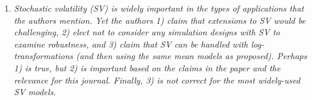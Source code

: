 \documentclass[a4paper,12pt]{article}
\begin{document}
\begin{enumerate}[label=\arabic*.,leftmargin=0.6cm]





\item {\color{black}\textit{Stochastic volatility (SV) is widely important in the types of applications that the authors mention. Yet the authors 1) claim that extensions to SV would be challenging, 2) elect not to consider any simulation designs with SV to examine robustness, and 3) claim that SV can be handled with log-transformations (and then using the same mean models as proposed). Perhaps 1) is true, but 2) is important based on the claims in the paper and the relevance for this journal. Finally, 3) is not correct for the most widely-used SV models.}}


\end{enumerate}
\end{document}
